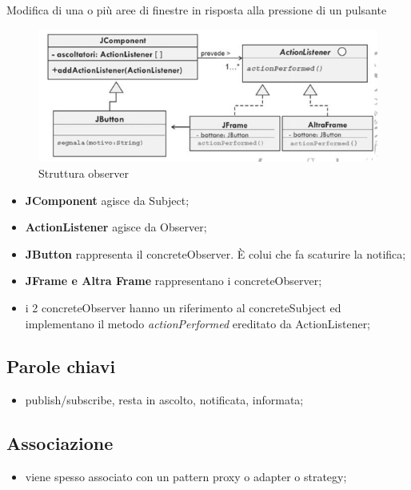  Modifica di una o più aree di finestre in risposta alla pressione di un pulsante
\begin{figure}[H]
\centering
\includegraphics[scale=0.8]{images/esempio1Observer}
\caption{Struttura observer\label{fig:UC3}}
\end{figure}
\begin{itemize}
	\item \textbf{JComponent} agisce da Subject;
	\item \textbf{ActionListener} agisce da Observer;
	\item \textbf{JButton} rappresenta il concreteObserver. È colui che fa scaturire la notifica;
	\item \textbf{JFrame e Altra Frame} rappresentano i concreteObserver;
	\item i 2 concreteObserver hanno un riferimento al concreteSubject ed implementano il metodo \textit{actionPerformed} ereditato da ActionListener;
	\end{itemize}

\subsection{Parole chiavi}
\begin{itemize}
\item publish/subscribe, resta  in  ascolto, notificata, informata;
\end{itemize}

\subsection{Associazione}
\begin{itemize}
\item viene spesso associato con un pattern proxy o adapter o strategy;
\end{itemize}